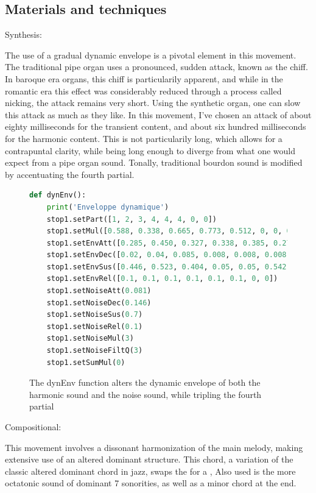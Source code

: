 \documentclass[12pt,twoside,maitrise]{dms_ks}
\theoremstyle{definition}
\begin{document}
\subsection{Materials and techniques}

Synthesis:

The use of a gradual dynamic envelope is a pivotal element in this movement.
The traditional pipe organ uses a pronounced, sudden attack, known as the chiff.
In baroque era organs, this chiff is particularily apparent, and while in the romantic era this effect was considerably reduced through a process called nicking, the attack remains very short.
Using the synthetic organ, one can slow this attack as much as they like. 
In this movement, I've chosen an attack of about eighty milliseconds for the transient content, and about six hundred milliseconds for the harmonic content. This is not particularily long, which allows for a contrapuntal clarity, while being long enough to diverge from what one would expect from a pipe organ sound.
Tonally, traditional bourdon sound is modified by accentuating the fourth partial.

\begin{figure}[H]
\begin{lstlisting}[language=Python]
def dynEnv():
    print('Enveloppe dynamique')
    stop1.setPart([1, 2, 3, 4, 4, 4, 0, 0])
    stop1.setMul([0.588, 0.338, 0.665, 0.773, 0.512, 0, 0, 0])
    stop1.setEnvAtt([0.285, 0.450, 0.327, 0.338, 0.385, 0.277, 0, 0])
    stop1.setEnvDec([0.02, 0.04, 0.085, 0.008, 0.008, 0.008, 0, 0])
    stop1.setEnvSus([0.446, 0.523, 0.404, 0.05, 0.05, 0.542, 0, 0])
    stop1.setEnvRel([0.1, 0.1, 0.1, 0.1, 0.1, 0.1, 0, 0])
    stop1.setNoiseAtt(0.081)
    stop1.setNoiseDec(0.146)
    stop1.setNoiseSus(0.7)
    stop1.setNoiseRel(0.1)
    stop1.setNoiseMul(3)
    stop1.setNoiseFiltQ(3)
    stop1.setSumMul(0)
\end{lstlisting}
\caption{The dynEnv function alters the dynamic envelope of both the harmonic sound and the noise sound, while tripling the fourth partial}
\end{figure}

Compositional:

This movement involves a dissonant harmonization of the main melody, making extensive use of an altered dominant  structure.
This chord, a variation of the classic altered dominant chord in jazz, swaps the  for a , 
Also used is the more octatonic sound of dominant 7   sonorities, as well as a minor  chord at the end.
\end{document}
